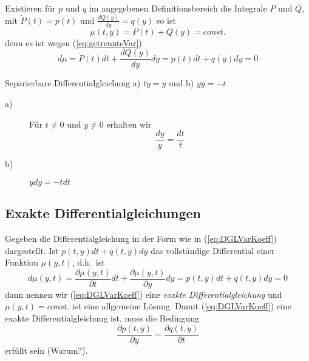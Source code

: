 Existieren für $p$ und $q$ im angegebenen Definitionsbereich die Integrale $P$
und $Q$, mit $\dot{P}(t)=p(t)$ und $\frac{dQ(y)}{dy}=q(y)$ so ist
\[\mu(t,y)=P(t)+Q(y)=const.\]
denn es ist wegen (\ref{eq:getrennteVar})
\[ d\mu=\dot{P}(t)dt+\frac{dQ(y)}{dy}dy=p(t)dt+q(y)dy=0\]
\begin{example}{Separierbare Differentialgleichung}
a) $t\dot{y}=y$ und b) $y\dot{y}=-t$
\begin{description}
  \item[a)] Für $t\ne 0$ und $y\ne 0$ erhalten wir 
  \[\frac{dy}{y}=\frac{dt}{t}\]
\item[b)] $ydy=-tdt$
\end{description}
\end{example}
\subsection{Exakte Differentialgleichungen}
Gegeben die Differentialgleichung in der Form wie in (\ref{eq:DGLVarKoeff}) dargestellt. Ist $p(t,y)dt+q(t,y)dy$ das vollständige Differential einer Funktion $\mu(y,t)$, d.h.\ ist 
\[d\mu(y,t)=\frac{\partial\mu(y,t)}{\partial t}dt+
\frac{\partial\mu(y,t)}{\partial y}dy=p(t,y)dt+q(t,y)dy=0\]
dann nennen wir (\ref{eq:DGLVarKoeff}) eine {\it exakte Differentialgleichung}
und $\mu(y,t)=const.$ ist eine allgemeine Lösung. Damit (\ref{eq:DGLVarKoeff})
eine exakte Differentialgleichung ist, muss die Bedingung
\begin{equation}
  \frac{\partial p(t,y)}{\partial y}=  \frac{\partial q(t,y)}{\partial t}
  \label{eq:BedExaktheit}
\end{equation}
erfüllt sein (Warum?).

